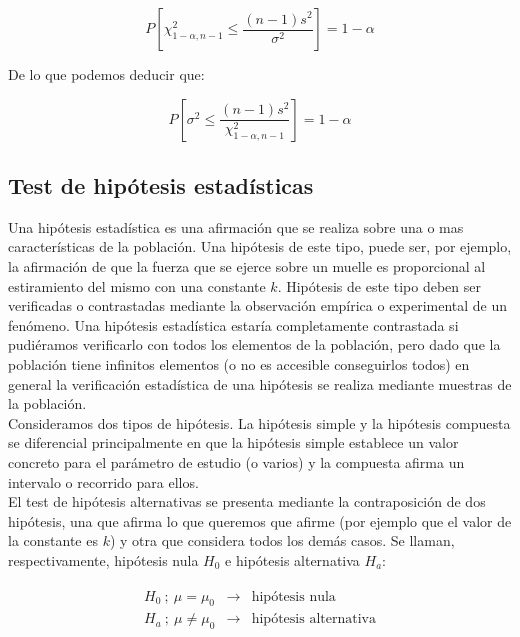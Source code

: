 \documentclass[12pt,a4paper]{book}
\begin{document}
\begin{equation} 
P\left[ \chi^2_{1 - \alpha,n-1} \leq \dfrac{(n-1)s^2}{\sigma^2} \right] = 1 - \alpha
\end{equation}

De lo que podemos deducir que:

\begin{equation}
P \left[ \sigma^2 \leq \dfrac{(n-1)s^2}{\chi^2_{1 - \alpha ,n-1}} \right] = 1 - \alpha
\end{equation}

\subsection{Test de hipótesis estadísticas}

Una hipótesis estadística es una afirmación que se realiza sobre una o mas características de la población. Una hipótesis de este tipo, puede ser, por ejemplo, la afirmación de que la fuerza que se ejerce sobre un muelle es proporcional al estiramiento del mismo con una constante $k$. Hipótesis de este tipo deben ser verificadas o contrastadas mediante la observación empírica o experimental de un fenómeno. Una hipótesis estadística estaría completamente contrastada si pudiéramos verificarlo con todos los elementos de la población, pero dado que la población tiene infinitos elementos (o no es accesible conseguirlos todos) en general la verificación estadística de una hipótesis se realiza mediante muestras de la población. \\

Consideramos dos tipos de hipótesis. La hipótesis simple y la hipótesis compuesta se diferencial principalmente en que la hipótesis simple establece un valor concreto para el parámetro de estudio (o varios) y la compuesta afirma un intervalo o recorrido para ellos. \\

El test de hipótesis alternativas se presenta mediante la contraposición de dos hipótesis, una que afirma lo que queremos que afirme (por ejemplo que el valor de la constante es $k$) y otra que considera todos los demás casos. Se llaman, respectivamente, hipótesis nula $H_0$ e hipótesis alternativa $H_a$:

\begin{gather}
\begin{array}{lll}
H_0 \ ; \ \mu = \mu_0 & \rightarrow & \text{hipótesis nula} \\
H_a \ ; \ \mu \neq \mu_0 & \rightarrow & \text{hipótesis alternativa} 
\end{array}
\end{gather}
\end{document}
